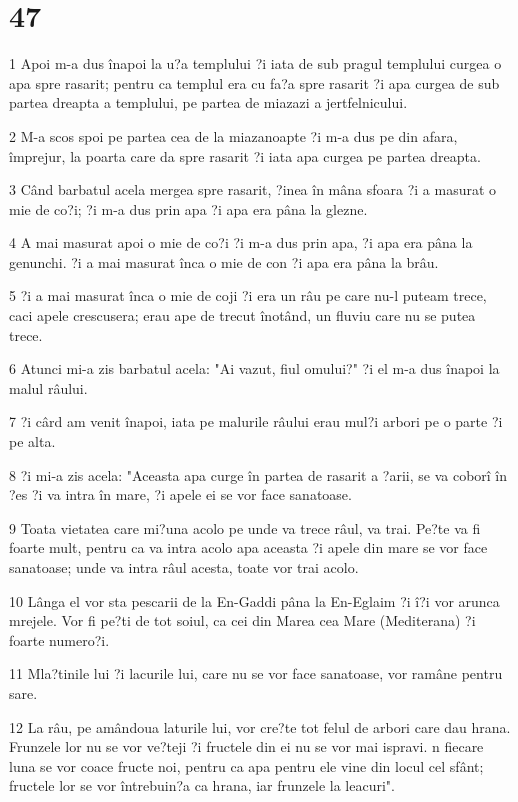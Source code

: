 \chapter{47}

\par 1 Apoi m-a dus înapoi la u?a templului ?i iata de sub pragul templului curgea o apa spre rasarit; pentru ca templul era cu fa?a spre rasarit ?i apa curgea de sub partea dreapta a templului, pe partea de miazazi a jertfelnicului.
\par 2 M-a scos spoi pe partea cea de la miazanoapte ?i m-a dus pe din afara, împrejur, la poarta care da spre rasarit ?i iata apa curgea pe partea dreapta.
\par 3 Când barbatul acela mergea spre rasarit, ?inea în mâna sfoara ?i a masurat o mie de co?i; ?i m-a dus prin apa ?i apa era pâna la glezne.
\par 4 A mai masurat apoi o mie de co?i ?i m-a dus prin apa, ?i apa era pâna la genunchi. ?i a mai masurat înca o mie de con ?i apa era pâna la brâu.
\par 5 ?i a mai masurat înca o mie de coji ?i era un râu pe care nu-l puteam trece, caci apele crescusera; erau ape de trecut înotând, un fluviu care nu se putea trece.
\par 6 Atunci mi-a zis barbatul acela: "Ai vazut, fiul omului?" ?i el m-a dus înapoi la malul râului.
\par 7 ?i cârd am venit înapoi, iata pe malurile râului erau mul?i arbori pe o parte ?i pe alta.
\par 8 ?i mi-a zis acela: "Aceasta apa curge în partea de rasarit a ?arii, se va coborî în ?es ?i va intra în mare, ?i apele ei se vor face sanatoase.
\par 9 Toata vietatea care mi?una acolo pe unde va trece râul, va trai. Pe?te va fi foarte mult, pentru ca va intra acolo apa aceasta ?i apele din mare se vor face sanatoase; unde va intra râul acesta, toate vor trai acolo.
\par 10 Lânga el vor sta pescarii de la En-Gaddi pâna la En-Eglaim ?i î?i vor arunca mrejele. Vor fi pe?ti de tot soiul, ca cei din Marea cea Mare (Mediterana) ?i foarte numero?i.
\par 11 Mla?tinile lui ?i lacurile lui, care nu se vor face sanatoase, vor ramâne pentru sare.
\par 12 La râu, pe amândoua laturile lui, vor cre?te tot felul de arbori care dau hrana. Frunzele lor nu se vor ve?teji ?i fructele din ei nu se vor mai ispravi. n fiecare luna se vor coace fructe noi, pentru ca apa pentru ele vine din locul cel sfânt; fructele lor se vor întrebuin?a ca hrana, iar frunzele la leacuri".

